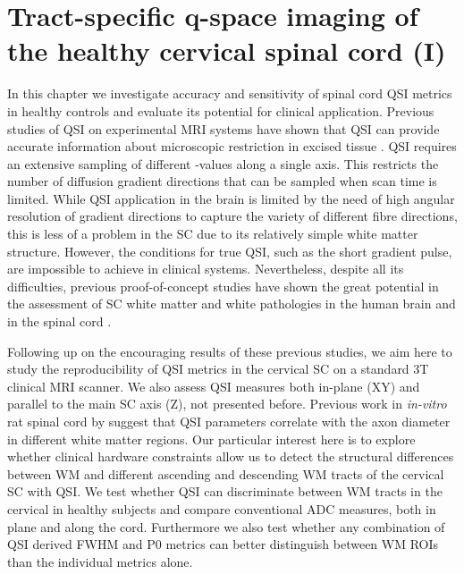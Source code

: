 \chapter{Tract-specific q-space imaging of the healthy cervical spinal cord (I)}
\label{chapter5}
\glsresetall %
In this chapter we investigate accuracy and sensitivity of spinal cord \gls{QSI} metrics in healthy controls and evaluate its potential for clinical application. Previous studies of \gls{QSI} on experimental MRI systems have shown that \gls{QSI} can provide accurate information about microscopic restriction in excised tissue \citep{Assaf:2000,Bar-Shir:2008,Ong:2008}. \Gls{QSI} requires an extensive sampling of different {\q}-values along a single axis. This restricts the number of diffusion gradient directions that can be sampled when scan time is limited. While \gls{QSI} application in the brain is limited by the need of high angular resolution of gradient directions to capture the variety of different fibre directions, this is less of a problem in the \gls{SC} due to its relatively simple white matter structure. However, the conditions for true \gls{QSI}, such as the short gradient pulse, are impossible to achieve in clinical systems. Nevertheless, despite all its difficulties, previous proof-of-concept studies have shown the great potential in the assessment of {\gls{SC}} white matter and white pathologies in the human brain \citep{Assaf:2002,Yamada:2012} and in the spinal cord \citep{Farrell:2008}.

Following up on the encouraging results of these previous studies, we aim here to study the reproducibility of \gls{QSI} metrics in the cervical {\gls{SC}} on a standard 3T clinical MRI scanner. We also assess \gls{QSI} measures both in-plane (XY) and parallel to the main {\gls{SC}} axis (Z), not presented before. Previous work in \emph{in-vitro} rat spinal cord by \citet{Ong:2008,Ong:2010} suggest that \gls{QSI} parameters correlate with the axon diameter in different white matter regions. Our particular interest here is to explore whether clinical hardware constraints allow us to detect the structural differences between \gls{WM} and different ascending and descending \gls{WM} tracts of the cervical {\gls{SC}} with \gls{QSI}. We test whether \gls{QSI} can discriminate between \gls{WM} tracts in the cervical in healthy subjects and compare conventional \gls{ADC} measures, both in plane and along the cord. Furthermore we also test whether any combination of \gls{QSI} derived FWHM and P0 metrics can better distinguish between WM \glspl{ROI} than the individual metrics alone.


